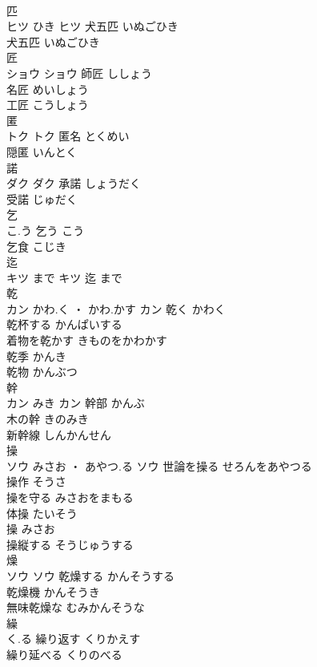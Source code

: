 \documentclass[8pt]{extreport}
\begin{document}
\begin{CJK}{UTF8}{min}
\\	匹	
\\	ヒツ	ひき	ヒツ	犬五匹	いぬごひき	
\\	犬五匹	いぬごひき	
\\	匠	
\\	ショウ		ショウ	師匠	ししょう	
\\	名匠	めいしょう	
\\	工匠	こうしょう	
\\	匿	
\\	トク		トク	匿名	とくめい	
\\	隠匿	いんとく	
\\	諾	
\\	ダク		ダク	承諾	しょうだく	
\\	受諾	じゅだく	
\\	乞	
\\	こ.う		乞う	こう	
\\	乞食	こじき	
\\	迄	
\\	キツ	まで	キツ													迄	まで	
\\	乾	
\\	カン	かわ.く ・ かわ.かす	カン	乾く	かわく	
\\	乾杯する	かんぱいする	
\\	着物を乾かす	きものをかわかす	
\\	乾季	かんき	
\\	乾物	かんぶつ	
\\	幹	
\\	カン	みき	カン	幹部	かんぶ	
\\	木の幹	きのみき	
\\	新幹線	しんかんせん	
\\	操	
\\	ソウ	みさお ・ あやつ.る	ソウ	世論を操る	せろんをあやつる	
\\	操作	そうさ	
\\	操を守る	みさおをまもる	
\\	体操	たいそう	
\\	操	みさお	
\\	操縦する	そうじゅうする	
\\	燥	
\\	ソウ		ソウ	乾燥する	かんそうする	
\\	乾燥機	かんそうき	
\\	無味乾燥な	むみかんそうな	
\\	繰	
\\	く.る		繰り返す	くりかえす	
\\	繰り延べる	くりのべる	

\end{CJK}
\end{document}
